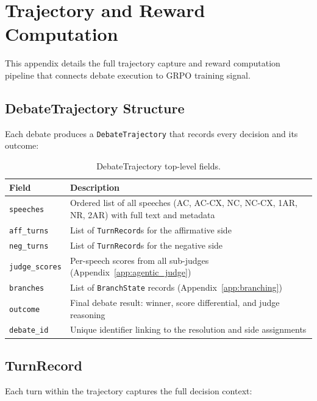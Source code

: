 \section{Trajectory and Reward Computation}
\label{app:trajectory}

This appendix details the full trajectory capture and reward computation
pipeline that connects debate execution to GRPO training signal.

\subsection{DebateTrajectory Structure}

Each debate produces a \texttt{DebateTrajectory} that records every
decision and its outcome:

\begin{table}[h]
\centering
\small
\begin{tabular}{lp{8cm}}
\toprule
\textbf{Field} & \textbf{Description} \\
\midrule
\texttt{speeches} & Ordered list of all speeches (AC, AC-CX, NC, NC-CX, 1AR, NR, 2AR) with full text and metadata \\
\texttt{aff\_turns} & List of \texttt{TurnRecord}s for the affirmative side \\
\texttt{neg\_turns} & List of \texttt{TurnRecord}s for the negative side \\
\texttt{judge\_scores} & Per-speech scores from all sub-judges (Appendix~\ref{app:agentic_judge}) \\
\texttt{branches} & List of \texttt{BranchState} records (Appendix~\ref{app:branching}) \\
\texttt{outcome} & Final debate result: winner, score differential, and judge reasoning \\
\texttt{debate\_id} & Unique identifier linking to the resolution and side assignments \\
\bottomrule
\end{tabular}
\caption{DebateTrajectory top-level fields.}
\label{tab:trajectory}
\end{table}

\subsection{TurnRecord}

Each turn within the trajectory captures the full decision context:


